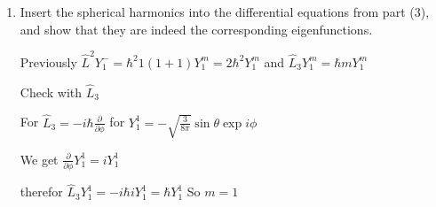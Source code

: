 \documentclass[11pt,a4paper]{scrartcl}
\begin{document}
\begin{enumerate}
\begin{itemize}
\begin{calculationbox}
\begin{calculationbox}
                                $= \hbar \exp(- i \phi) (- C \cos\theta \exp(i\phi) - C \cos\theta \exp(i\phi))$

                                $= - 2\hbar C \cos\theta$

                                Therefore $y_1^0 = -\sqrt{2} C \cos\theta$ with $C = -\sqrt{\frac{3}{8\pi}}$
                            \end{calculationbox}

                            for $l=1, m=-1$
                            \begin{calculationbox}
                                $\hbar \sqrt{2} Y_1^{-2} = \hat{L}_- Y_1^0$

                                $= \hbar \exp(-i \phi) (-\frac{\partial}{\partial \theta} + i \cot\theta \frac{\partial }{\partial \phi}) \sqrt{\frac{3}{4\pi}} \cos\theta$

                                $= \hbar \exp(- i \phi) (- \sqrt{\frac{3}{4\pi}} \sin\theta)$

                                Therefore $Y_1^{-1} = \sqrt{\frac{3}{8\pi}} \sin\theta \exp{-i \phi}$
                            \end{calculationbox}
                        \end{calculationbox}
                \end{itemize}
            
            \item
                Insert the spherical harmonics into the differential equations from part (3), and show that they are indeed the corresponding eigenfunctions.
                \begin{calculationbox}
                    Previously $\hat{L}^2 Y_1^- = \hbar^2 1 (1+ 1) Y_1^m = 2 \hbar^2 Y_1^m$ and $\hat{L}_3Y_1^m = \hbar m Y_1^m$

                    Check with $\hat{L}_3$
                    \begin{calculationbox}
                        For $\hat{L}_3 = - i \hbar \frac{\partial}{\partial \phi}$ for $Y_1^1 = -\sqrt{\frac{3}{8\pi}}\sin\theta \exp{i\phi}$
                        
                        We get $\frac{\partial}{\partial \phi} Y_1^1 = i Y_1^1$

                        therefor $\hat{L}_3 Y_1^1 = - i \hbar i Y_1^1 = \hbar Y_1^1$ So $m = 1$

                    \end{calculationbox}


\end{calculationbox}
\end{enumerate}
\end{document}
